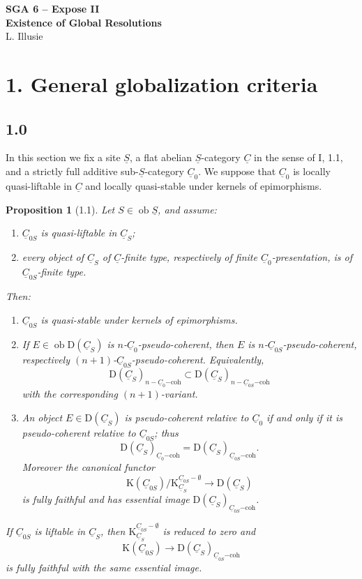 \documentclass[13pt]{extarticle}
\newcommand{\uS}{\underline S}
\newcommand{\uC}{\underline C}
\newcommand{\D}{\mathrm D}
\newcommand{\K}{\mathrm K}
\newcommand{\ob}{\operatorname{ob}}
\newtheorem*{proposition*}{Proposition}
\begin{document}
\begin{center}
{\Large\textbf{SGA 6 -- Expose II}}\\[0.35em]
{\large\textbf{Existence of Global Resolutions}}\\[0.25em]
{\large L. Illusie}
\end{center}

\section*{1. General globalization criteria}

\subsection*{1.0}
In this section we fix a site $\uS$, a flat abelian $\uS$-category $\uC$ in the sense of I, 1.1, and a strictly full additive sub-$\uS$-category $\uC_0$. We suppose that $\uC_0$ is locally quasi-liftable in $\uC$ and locally quasi-stable under kernels of epimorphisms.

\begin{proposition*}[1.1]
Let $S\in\ob\uS$, and assume:
\begin{enumerate}[label=(\roman*)]
\item $\uC_{0S}$ is quasi-liftable in $\uC_S$;
\item every object of $\uC_S$ of $\uC$-finite type, respectively of finite $\uC_0$-presentation, is of $\uC_{0S}$-finite type.
\end{enumerate}
Then:
\begin{enumerate}[label=\alph*)]
\item $\uC_{0S}$ is quasi-stable under kernels of epimorphisms.
\item If $E\in\ob\D(\uC_S)$ is $n$-$\uC_0$-pseudo-coherent, then $E$ is $n$-$\uC_{0S}$-pseudo-coherent, respectively $(n+1)$-$\uC_{0S}$-pseudo-coherent. Equivalently,
\[
\D(\uC_S)_{n-\uC_0\mathrm{-coh}}
\subset
\D(\uC_S)_{n-\uC_{0S}\mathrm{-coh}}
\]
with the corresponding $(n+1)$-variant.
\item An object $E\in\D(\uC_S)$ is pseudo-coherent relative to $\uC_0$ if and only if it is pseudo-coherent relative to $\uC_{0S}$; thus
\[
\D(\uC_S)_{\uC_0\mathrm{-coh}}=
\D(\uC_S)_{\uC_{0S}\mathrm{-coh}}.
\]
Moreover the canonical functor
\[
\K(\uC_{0S})/\K^{\uC_{0S}-\emptyset}_{\uC_S}
\longrightarrow \D(\uC_S)
\]
is fully faithful and has essential image $\D(\uC_S)_{\uC_{0S}\mathrm{-coh}}$.
\end{enumerate}
If $\uC_{0S}$ is liftable in $\uC_S$, then $\K^{\uC_{0S}-\emptyset}_{\uC_S}$ is reduced to zero and
\[
\K(\uC_{0S})\longrightarrow \D(\uC_S)_{\uC_{0S}\mathrm{-coh}}
\]
is fully faithful with the same essential image.
\end{proposition*}
\end{document}
